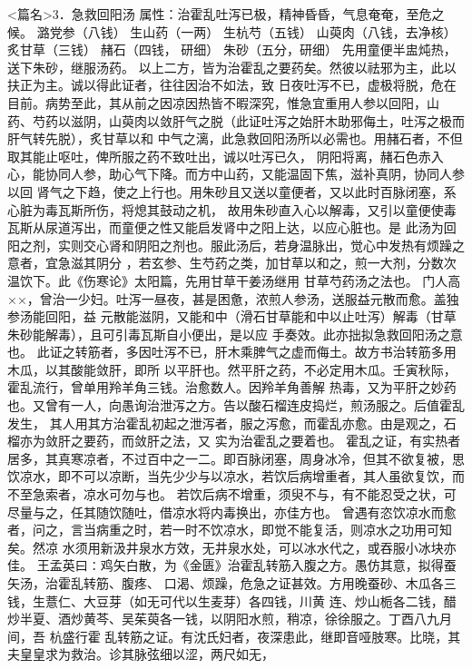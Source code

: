 \documentclass[a4paper,12pt,UTF8,twoside]{ctexbook}
\begin{document}
<篇名>3．急救回阳汤
属性：治霍乱吐泻已极，精神昏昏，气息奄奄，至危之候。 
潞党参（八钱） 生山药（一两） 生杭芍（五钱） 山萸肉（八钱，去净核） 炙甘草（三钱） 赭石（四钱， 
研细） 朱砂（五分，研细） 
先用童便半盅炖热，送下朱砂，继服汤药。 
以上二方，皆为治霍乱之要药矣。然彼以祛邪为主，此以扶正为主。诚以得此证者，往往因治不如法，致 
日夜吐泻不已，虚极将脱，危在目前。病势至此，其从前之因凉因热皆不暇深究，惟急宜重用人参以回阳，山 
药、芍药以滋阴，山萸肉以敛肝气之脱（此证吐泻之始肝木助邪侮土，吐泻之极而肝气转先脱），炙甘草以和 
中气之漓，此急救回阳汤所以必需也。用赭石者，不但取其能止呕吐，俾所服之药不致吐出，诚以吐泻已久， 
阴阳将离，赭石色赤入心，能协同人参，助心气下降。而方中山药，又能温固下焦，滋补真阴，协同人参以回 
肾气之下趋，使之上行也。用朱砂且又送以童便者，又以此时百脉闭塞，系心脏为毒瓦斯所伤，将熄其鼓动之机， 
故用朱砂直入心以解毒，又引以童便使毒瓦斯从尿道泻出，而童便之性又能启发肾中之阳上达，以应心脏也。是 
此汤为回阳之剂，实则交心肾和阴阳之剂也。服此汤后，若身温脉出，觉心中发热有烦躁之意者，宜急滋其阴分 
，若玄参、生芍药之类，加甘草以和之，煎一大剂，分数次温饮下。此《伤寒论》太阳篇，先用甘草干姜汤继用 
甘草芍药汤之法也。 
门人高××，曾治一少妇。吐泻一昼夜，甚是困惫，浓煎人参汤，送服益元散而愈。盖独参汤能回阳，益 
元散能滋阴，又能和中（滑石甘草能和中以止吐泻）解毒（甘草朱砂能解毒），且可引毒瓦斯自小便出，是以应 
手奏效。此亦拙拟急救回阳汤之意也。 
此证之转筋者，多因吐泻不已，肝木乘脾气之虚而侮土。故方书治转筋多用木瓜，以其酸能敛肝，即所 
以平肝也。然平肝之药，不必定用木瓜。壬寅秋际，霍乱流行，曾单用羚羊角三钱。治愈数人。因羚羊角善解 
热毒，又为平肝之妙药也。又曾有一人，向愚询治泄泻之方。告以酸石榴连皮捣烂，煎汤服之。后值霍乱发生， 
其人用其方治霍乱初起之泄泻者，服之泻愈，而霍乱亦愈。由是观之，石榴亦为敛肝之要药，而敛肝之法，又 
实为治霍乱之要着也。 
霍乱之证，有实热者居多，其真寒凉者，不过百中之一二。即百脉闭塞，周身冰冷，但其不欲复被，思 
饮凉水，即不可以凉断，当先少少与以凉水，若饮后病增重者，其人虽欲复饮，而不至急索者，凉水可勿与也。 
若饮后病不增重，须臾不与，有不能忍受之状，可尽量与之，任其随饮随吐，借凉水将内毒换出，亦佳方也。 
曾遇有恣饮凉水而愈者，问之，言当病重之时，若一时不饮凉水，即觉不能复活，则凉水之功用可知矣。然凉 
水须用新汲井泉水方效，无井泉水处，可以冰水代之，或吞服小冰块亦佳。 
王孟英曰∶鸡矢白散，为《金匮》治霍乱转筋入腹之方。愚仿其意，拟得蚕矢汤，治霍乱转筋、腹疼、 
口渴、烦躁，危急之证甚效。方用晚蚕砂、木瓜各三钱，生薏仁、大豆芽（如无可代以生麦芽）各四钱，川黄 
连、炒山栀各二钱，醋炒半夏、酒炒黄芩、吴茱萸各一钱，以阴阳水煎，稍凉，徐徐服之。丁酉八九月间，吾 
杭盛行霍 
乱转筋之证。有沈氏妇者，夜深患此，继即音哑肢寒。比晓，其夫皇皇求为救治。诊其脉弦细以涩，两尺如无， 
\end{document}
